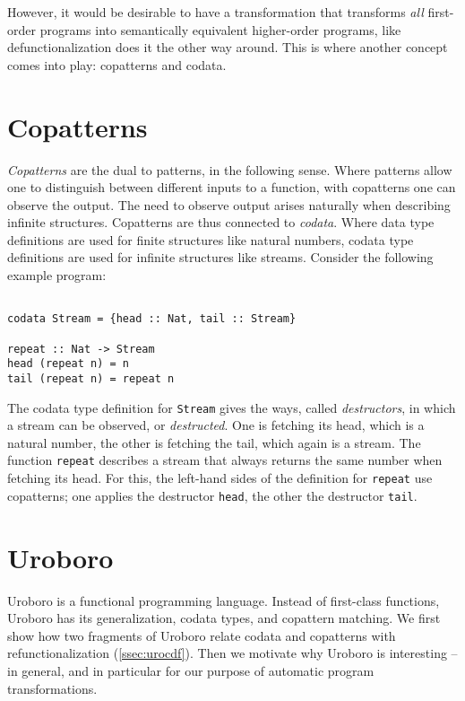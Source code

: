 However, it would be desirable to have a transformation that transforms \textit{all} first-order programs into semantically equivalent higher-order programs, like defunctionalization does it the other way around. This is where another concept comes into play: copatterns and codata.

\section{Copatterns}
\label{sec:cp}

\textit{Copatterns} are the dual to patterns, in the following sense. Where patterns allow one to distinguish between different inputs to a function, with copatterns one can observe the output. The need to observe output arises naturally when describing infinite structures. Copatterns are thus connected to \textit{codata}. Where data type definitions are used for finite structures like natural numbers, codata type definitions are used for infinite structures like streams. Consider the following example program:

\begin{lstlisting}

codata Stream = {head :: Nat, tail :: Stream}

repeat :: Nat -> Stream
head (repeat n) = n
tail (repeat n) = repeat n

\end{lstlisting}

The codata type definition for \texttt{Stream} gives the ways, called \textit{destructors}, in which a stream can be observed, or \textit{destructed}. One is fetching its head, which is a natural number, the other is fetching the tail, which again is a stream. The function \texttt{repeat} describes a stream that always returns the same number when fetching its head. For this, the left-hand sides of the definition for \texttt{repeat} use copatterns; one applies the destructor \texttt{head}, the other the destructor \texttt{tail}.

\section{Uroboro}
\label{sec:uro}

Uroboro is a functional programming language. Instead of first-class functions, Uroboro has its generalization, codata types, and copattern matching. We first show how two fragments of Uroboro relate codata and copatterns with refunctionalization (\autoref{ssec:urocdf}). Then we motivate why Uroboro is interesting -- in general, and in particular for our purpose of automatic program transformations.

